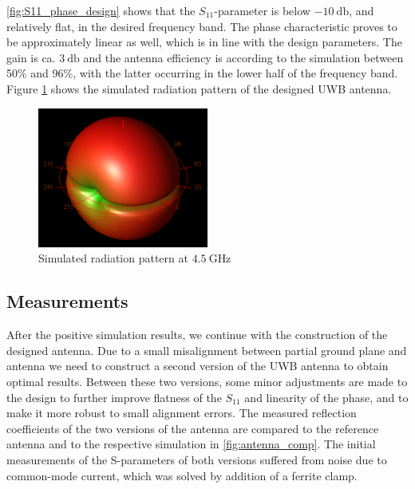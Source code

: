 \documentclass[a4paper]{article}        %
\begin{document}
		\autoref{fig:S11_phase_design} shows that the $S_{11}$-parameter is below $\SI{-10}{\decibel}$, and relatively flat, in the desired frequency band. The phase characteristic proves to be approximately linear as well, which is in line with the design parameters. The gain is ca. $\SI{3}{\decibel}$ and the antenna efficiency is according to the simulation between 50\% and 96\%, with the latter occurring in the lower half of the frequency band. 
		Figure \ref{fig:ant_radpat_sim} shows the simulated radiation pattern of the designed UWB antenna.

		\begin{figure}[H]
		\centering
			\includegraphics[width=0.5\textwidth]{images/antenna/rad_pat_ADS_sim.png}
			\caption{Simulated radiation pattern at $\SI{4.5}{\giga\hertz}$}
			\label{fig:ant_radpat_sim}
		\end{figure}

	\subsection{Measurements}
		After the positive simulation results, we continue with the construction of the designed antenna. Due to a small misalignment between partial ground plane and antenna we need to construct a second version of the UWB antenna to obtain optimal results. Between these two versions, some minor adjustments are made to the design to further improve flatness of the $S_{11}$ and linearity of the phase, and to make it more robust to small alignment errors. The measured reflection coefficients of the two versions of the antenna are compared to the reference antenna and to the respective simulation in \autoref{fig:antenna_comp}. The initial measurements of the S-parameters of both versions suffered from noise due to common-mode current, which was solved by addition of a ferrite clamp.
\end{document}
